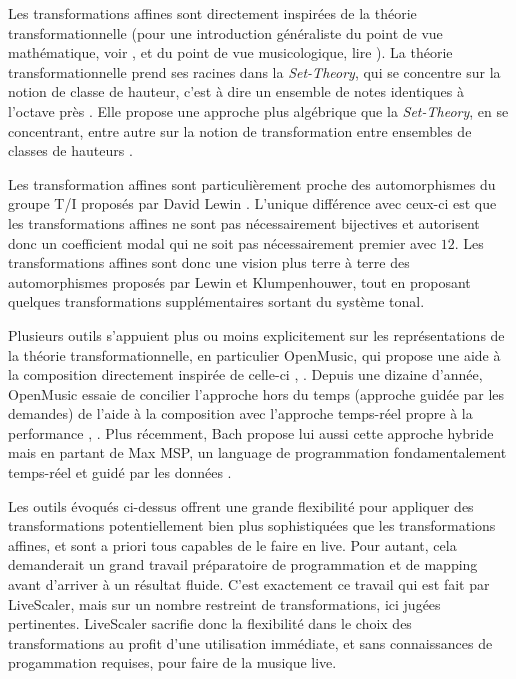 


Les transformations affines sont directement inspirées de la théorie transformationnelle  (pour une introduction généraliste du point de vue mathématique, voir \cite{andreatta2008calcul}, et du point de vue musicologique, lire \cite{andreatta2014introduction}). La théorie transformationnelle prend ses racines dans la \emph{Set-Theory}, qui se concentre sur la notion de classe de hauteur, c'est à dire un ensemble de notes identiques à l'octave près \cite{forte1973structure}. Elle propose une approche plus algébrique que la \emph{Set-Theory}, en se concentrant, entre autre sur la notion de transformation entre ensembles de classes de hauteurs \cite{lewin1987generalized}. 

Les transformation affines sont particulièrement proche des automorphismes du groupe T/I proposés par David Lewin \cite{lewin1990klumpenhouwer}. L'unique différence avec ceux-ci est que les transformations affines ne sont pas nécessairement bijectives et autorisent donc un coefficient modal qui ne soit pas nécessairement premier avec $12$. Les transformations affines sont donc une vision plus terre à terre des automorphismes proposés par Lewin et Klumpenhouwer, tout en proposant quelques transformations supplémentaires sortant du système tonal.

Plusieurs outils s'appuient plus ou moins explicitement sur les représentations de la théorie transformationnelle, en particulier OpenMusic, qui propose une aide à la composition directement inspirée de celle-ci \cite{andreatta2003implementing}, \cite{andreatta2003formalisation}. Depuis une dizaine d'année, OpenMusic essaie de concilier l'approche hors du temps (approche guidée par les demandes) de l'aide à la composition avec l'approche temps-réel propre à la performance \cite{bresson2014reactive}, \cite{bresson2017next}. Plus récemment, Bach propose lui aussi cette approche hybride mais en partant de Max MSP, un language de programmation fondamentalement temps-réel et guidé par les données \cite{agostini2021programming}.

Les outils évoqués ci-dessus offrent une grande flexibilité pour appliquer des transformations potentiellement bien plus sophistiquées que les transformations affines, et sont a priori tous capables de le faire en live. Pour autant, cela demanderait un grand travail préparatoire de programmation et de mapping avant d'arriver à un résultat fluide. C'est exactement ce travail qui est fait par LiveScaler, mais sur un nombre restreint de transformations, ici jugées pertinentes. LiveScaler sacrifie donc la flexibilité dans le choix des transformations au profit d'une utilisation immédiate, et sans connaissances de progammation requises, pour faire de la musique live.

